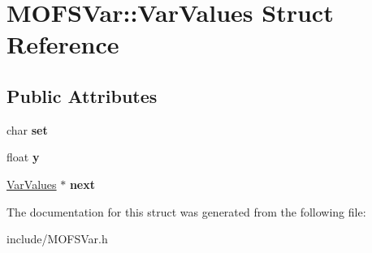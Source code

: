 \hypertarget{structMOFSVar_1_1VarValues}{\section{M\-O\-F\-S\-Var\-:\-:Var\-Values Struct Reference}
\label{structMOFSVar_1_1VarValues}
}
\subsection*{Public Attributes}
\begin{DoxyCompactItemize}
\item 
\hypertarget{structMOFSVar_1_1VarValues_ad0dbcb40b513a96c980b2f9e3bb7a599}{char {\bfseries set}}\label{structMOFSVar_1_1VarValues_ad0dbcb40b513a96c980b2f9e3bb7a599}

\item 
\hypertarget{structMOFSVar_1_1VarValues_a14b6877731e6bfa98908d3682d07f979}{float {\bfseries y}}\label{structMOFSVar_1_1VarValues_a14b6877731e6bfa98908d3682d07f979}

\item 
\hypertarget{structMOFSVar_1_1VarValues_a5dd9878fc1ce0a92a3a388ccfdb394ba}{\hyperlink{structMOFSVar_1_1VarValues}{Var\-Values} $\ast$ {\bfseries next}}\label{structMOFSVar_1_1VarValues_a5dd9878fc1ce0a92a3a388ccfdb394ba}

\end{DoxyCompactItemize}


The documentation for this struct was generated from the following file\-:\begin{DoxyCompactItemize}
\item 
include/M\-O\-F\-S\-Var.\-h\end{DoxyCompactItemize}
